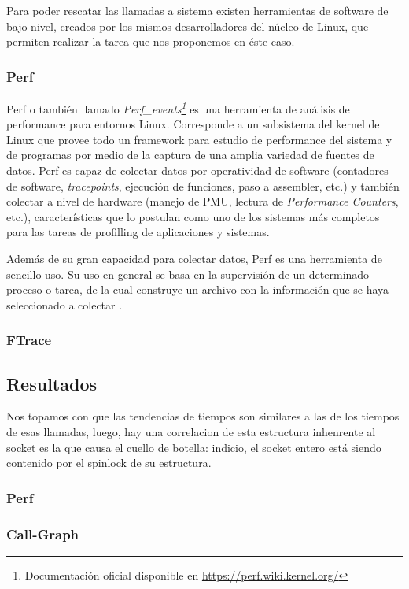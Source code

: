 Para poder rescatar las llamadas a sistema existen herramientas de software de bajo nivel, creados por los mismos desarrolladores del núcleo de Linux, que permiten realizar la tarea que nos proponemos en éste caso.

\subsubsection{Perf}
Perf \cite{slides:perfTools} o también llamado \emph{Perf\_events\footnote{Documentación oficial disponible en \url{https://perf.wiki.kernel.org/}}} es una herramienta de análisis de performance para entornos Linux. Corresponde a un subsistema del kernel de Linux que provee todo un framework para estudio de performance del sistema y de programas por medio de la captura de una amplia variedad de fuentes de datos. Perf es capaz de colectar datos por operatividad de software (contadores de software, \emph{tracepoints}, ejecución de funciones, paso a assembler, etc.) y también colectar a nivel de hardware (manejo de PMU, lectura de \emph{Performance Counters}, etc.), características que lo postulan como uno de los sistemas más completos para las tareas de profilling de aplicaciones y sistemas.

Además de su gran capacidad para colectar datos, Perf es una herramienta de sencillo uso. Su uso en general se basa en la supervisión de un determinado proceso o tarea, de la cual construye un archivo con la información que se haya seleccionado a colectar \cite{article:perf}.


\subsubsection{FTrace}
\subsection{Resultados}
Nos topamos con que las tendencias de tiempos son similares a las de los tiempos de esas llamadas, luego, hay una correlacion de esta estructura inhenrente al socket es la que causa el cuello de botella: indicio, el socket entero está siendo contenido por el spinlock de su estructura.
\subsubsection{Perf}
\subsubsection{Call-Graph}

